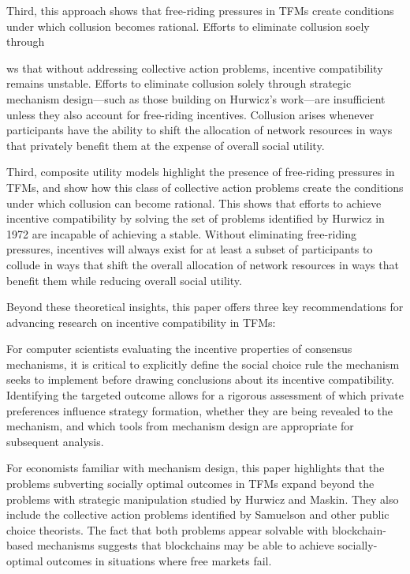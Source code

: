 \documentclass[oneside]{article}   	%
\begin{document}
Third, this approach shows that free-riding pressures in TFMs create conditions under which collusion becomes rational. Efforts to eliminate collusion soely through 

ws that without addressing collective action problems, incentive compatibility remains unstable. Efforts to eliminate collusion solely through strategic mechanism design—such as those building on Hurwicz's work—are insufficient unless they also account for free-riding incentives. Collusion arises whenever participants have the ability to shift the allocation of network resources in ways that privately benefit them at the expense of overall social utility.

Third, composite utility models highlight the presence of free-riding pressures in TFMs, and show how this class of collective action problems create the conditions under which collusion can become rational. This shows that efforts to achieve incentive compatibility by solving the set of problems identified by Hurwicz in 1972 are incapable of achieving a stable. Without eliminating free-riding pressures, incentives will always exist for at least a subset of participants to collude in ways that shift the overall allocation of network resources in ways that benefit them while reducing overall social utility.

Beyond these theoretical insights, this paper offers three key recommendations for advancing research on incentive compatibility in TFMs:

For computer scientists evaluating the incentive properties of consensus mechanisms, it is critical to explicitly define the social choice rule the mechanism seeks to implement before drawing conclusions about its incentive compatibility. Identifying the targeted outcome allows for a rigorous assessment of which private preferences influence strategy formation, whether they are being revealed to the mechanism, and which tools from mechanism design are appropriate for subsequent analysis.

For economists familiar with mechanism design, this paper highlights that the problems subverting socially optimal outcomes in TFMs expand beyond the problems with strategic manipulation studied by Hurwicz and Maskin. They also include the collective action problems identified by Samuelson and other public choice theorists. The fact that both problems appear solvable with blockchain-based mechanisms suggests that blockchains may be able to achieve socially-optimal outcomes in situations where free markets fail.
\end{document}
